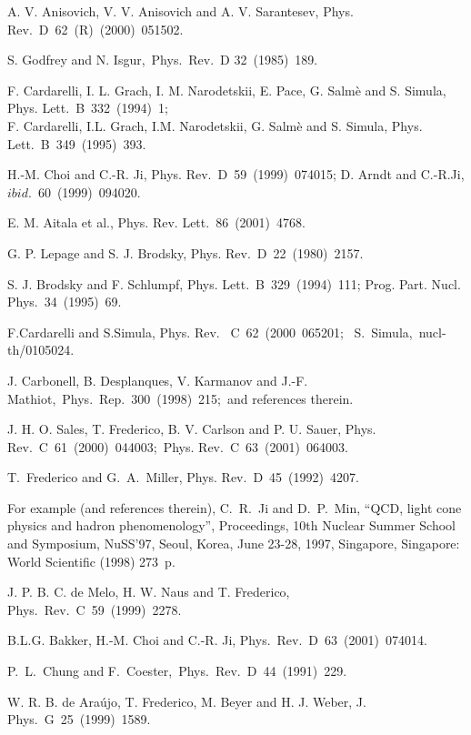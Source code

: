 \documentclass[preprint,aps,showpacs,floatfix]{revtex4}
\begin{document}
\begin{thebibliography}{99}
 
A. V. Anisovich, V. V. Anisovich and A. V. Sarantesev, Phys.
Rev.~D~62~(R)~(2000)~051502.


S. Godfrey and N. Isgur,~Phys.~Rev.~D 32~(1985)~189.


 F. Cardarelli, I. L. Grach, I. M. Narodetskii, E. Pace,
G. Salm\`e and S. Simula, Phys. Lett.~B~332~(1994)~1;\\
 F. Cardarelli, I.L. Grach, I.M. Narodetskii,
G. Salm\`e and S. Simula, Phys. Lett.~B~349~(1995)~393.


H.-M. Choi and C.-R. Ji, Phys. Rev.~D~59~(1999)~074015;
D. Arndt and C.-R.Ji, $ibid.$~60~(1999)~094020.

E. M. Aitala et al., Phys. Rev. Lett.~86~(2001)~4768.


 G. P. Lepage and S. J. Brodsky, Phys. Rev.~D~22~(1980)~2157. 
  
S. J. Brodsky and F. Schlumpf, Phys. Lett.~B~329~(1994)~111; 
Prog. Part. Nucl. Phys.~34~(1995)~69.
 
 F.Cardarelli and S.Simula, Phys. Rev.
~C~62~(2000~065201;~ S.~Simula,~nucl-th/0105024.
    
  J. Carbonell, B. Desplanques, V. Karmanov and
J.-F. Mathiot,~Phys.~Rep.~300~(1998)~215;~and references therein.

 J. H. O. Sales, T. Frederico, B. V. Carlson and
 P. U. Sauer, Phys. Rev.~C~61~(2000)~044003;~Phys. Rev.~C~63~(2001)~064003.

T.~Frederico and G.~A.~Miller, Phys. Rev.~D~45~(1992)~4207.

  For example (and references therein), C.~R.~Ji and D.~P.~Min,
  ``QCD, light cone physics and hadron phenomenology'',  
  Proceedings, 10th Nuclear Summer School and Symposium, NuSS'97, Seoul, Korea, June 23-28, 1997, 
  Singapore, Singapore: World Scientific (1998) 273~p.

J. P. B. C. de Melo, H. W. Naus and T. Frederico,
Phys.~Rev.~C~59~(1999)~2278.  
  
 B.L.G. Bakker, H.-M. Choi and C.-R. Ji,
Phys.~Rev.~D~63~(2001)~074014.

P.~L.~Chung and F.~Coester,~Phys.~Rev.~D~44~(1991)~229.


W. R. B. de Ara\'ujo, T. Frederico, M. Beyer and H.
J. Weber, J. Phys.~G~25~(1999)~1589.


\end{thebibliography}
\end{document}
